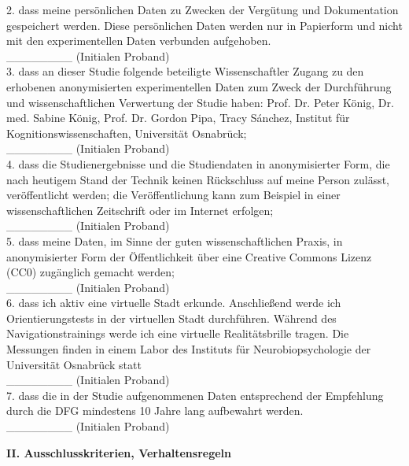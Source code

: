 2.     dass meine persönlichen Daten zu Zwecken der Vergütung und Dokumentation gespeichert werden. Diese persönlichen Daten werden nur in Papierform und nicht mit den experimentellen Daten verbunden aufgehoben. \\
\_\_\_\_\_\_\_\_ (Initialen Proband) \\

3.     dass an dieser Studie folgende beteiligte Wissenschaftler Zugang zu den erhobenen anonymisierten experimentellen Daten zum Zweck der Durchführung und wissenschaftlichen Verwertung der Studie haben: Prof. Dr. Peter König, Dr. med. Sabine König, Prof. Dr. Gordon Pipa, Tracy Sánchez, Institut für Kognitionswissenschaften, Universität Osnabrück;  \\
\_\_\_\_\_\_\_\_ (Initialen Proband) \\

4.     dass die Studienergebnisse und die Studiendaten in anonymisierter Form, die nach heutigem Stand der Technik keinen Rückschluss auf meine Person zulässt, veröffentlicht werden; die Veröffentlichung kann zum Beispiel in einer wissenschaftlichen Zeitschrift oder im Internet erfolgen;  \\
\_\_\_\_\_\_\_\_ (Initialen Proband) \\

5.     dass meine Daten, im Sinne der guten wissenschaftlichen Praxis, in anonymisierter Form der Öffentlichkeit über eine Creative Commons Lizenz (CC0) zugänglich gemacht werden;  \\
\_\_\_\_\_\_\_\_ (Initialen Proband) \\

6.     dass ich aktiv eine virtuelle Stadt erkunde. Anschließend werde ich Orientierungstests in der virtuellen Stadt durchführen. Während des Navigationstrainings werde ich eine virtuelle Realitätsbrille tragen. Die Messungen finden in einem Labor des Instituts für Neurobiopsychologie der Universität Osnabrück statt  \\
\_\_\_\_\_\_\_\_ (Initialen Proband) \\

7. dass die in der Studie aufgenommenen Daten entsprechend der Empfehlung durch die DFG mindestens 10 Jahre lang aufbewahrt werden. \\
\_\_\_\_\_\_\_\_ (Initialen Proband) \\

\begin{center}
	\large{\textbf{II. Ausschlusskriterien, Verhaltensregeln}} \\
\end{center}

